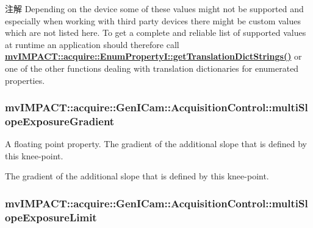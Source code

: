\begin{DoxyNote}{注解}
Depending on the device some of these values might not be supported and especially when working with third party devices there might be custom values which are not listed here. To get a complete and reliable list of supported values at runtime an application should therefore call {\bfseries \hyperlink{classmv_i_m_p_a_c_t_1_1acquire_1_1_enum_property_i_a0ba6ccbf5ee69784d5d0b537924d26b6}{mv\+I\+M\+P\+A\+C\+T\+::acquire\+::\+Enum\+Property\+I\+::get\+Translation\+Dict\+Strings()}} or one of the other functions dealing with translation dictionaries for enumerated properties. 
\end{DoxyNote}
\hypertarget{classmv_i_m_p_a_c_t_1_1acquire_1_1_gen_i_cam_1_1_acquisition_control_a81561b228b3d765db02eeedef2bedbdf}{
\subsubsection[{multi\+Slope\+Exposure\+Gradient}]{ mv\+I\+M\+P\+A\+C\+T\+::acquire\+::\+Gen\+I\+Cam\+::\+Acquisition\+Control\+::multi\+Slope\+Exposure\+Gradient}}\label{classmv_i_m_p_a_c_t_1_1acquire_1_1_gen_i_cam_1_1_acquisition_control_a81561b228b3d765db02eeedef2bedbdf}


A floating point property. The gradient of the additional slope that is defined by this knee-\/point. 

The gradient of the additional slope that is defined by this knee-\/point. \hypertarget{classmv_i_m_p_a_c_t_1_1acquire_1_1_gen_i_cam_1_1_acquisition_control_acdf0b3638aaaa29315dfe1a7ff9cce35}{
\subsubsection[{multi\+Slope\+Exposure\+Limit}]{ mv\+I\+M\+P\+A\+C\+T\+::acquire\+::\+Gen\+I\+Cam\+::\+Acquisition\+Control\+::multi\+Slope\+Exposure\+Limit}}\label{classmv_i_m_p_a_c_t_1_1acquire_1_1_gen_i_cam_1_1_acquisition_control_acdf0b3638aaaa29315dfe1a7ff9cce35}


